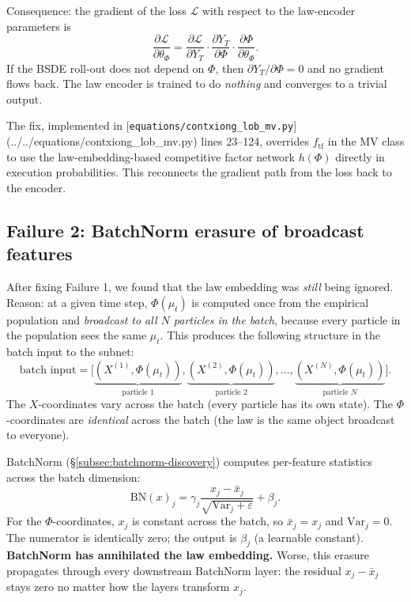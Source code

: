 Consequence: the gradient of the loss $\mathcal{L}$ with respect to the law-encoder parameters is
\begin{equation}
  \frac{\partial \mathcal{L}}{\partial \theta_\Phi} = \frac{\partial \mathcal{L}}{\partial Y_T} \cdot \frac{\partial Y_T}{\partial \Phi} \cdot \frac{\partial \Phi}{\partial \theta_\Phi}.
\end{equation}
If the BSDE roll-out does not depend on $\Phi$, then $\partial Y_T / \partial \Phi = 0$ and no gradient flows back. The law encoder is trained to do \emph{nothing} and converges to a trivial output.

The fix, implemented in [\texttt{equations/contxiong\_lob\_mv.py}](../../equations/contxiong_lob_mv.py) lines 23--124, overrides $f_{\text{tf}}$ in the MV class to use the law-embedding-based competitive factor network $h(\Phi)$ directly in execution probabilities. This reconnects the gradient path from the loss back to the encoder.

\subsection{Failure 2: BatchNorm erasure of broadcast features}
\label{subsec:batchnorm-erasure}

After fixing Failure 1, we found that the law embedding was \emph{still} being ignored. Reason: at a given time step, $\Phi(\mu_t)$ is computed once from the empirical population and \emph{broadcast to all $N$ particles in the batch}, because every particle in the population sees the same $\mu_t$. This produces the following structure in the batch input to the subnet:
\begin{equation}
  \text{batch input} = \bigl[\underbrace{(X^{(1)}, \Phi(\mu_t))}_{\text{particle 1}}, \underbrace{(X^{(2)}, \Phi(\mu_t))}_{\text{particle 2}}, \ldots, \underbrace{(X^{(N)}, \Phi(\mu_t))}_{\text{particle }N}\bigr].
\end{equation}
The $X$-coordinates vary across the batch (every particle has its own state). The $\Phi$-coordinates are \emph{identical} across the batch (the law is the same object broadcast to everyone).

BatchNorm (§\ref{subsec:batchnorm-discovery}) computes per-feature statistics across the batch dimension:
\[
  \mathrm{BN}(x)_j = \gamma_j \frac{x_j - \bar x_j}{\sqrt{\text{Var}_j + \varepsilon}} + \beta_j.
\]
For the $\Phi$-coordinates, $x_j$ is constant across the batch, so $\bar x_j = x_j$ and $\text{Var}_j = 0$. The numerator is identically zero; the output is $\beta_j$ (a learnable constant). \textbf{BatchNorm has annihilated the law embedding.} Worse, this erasure propagates through every downstream BatchNorm layer: the residual $x_j - \bar x_j$ stays zero no matter how the layers transform $x_j$.

